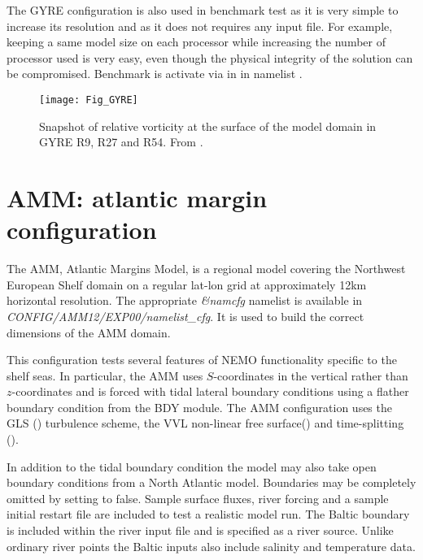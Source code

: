\documentclass[../tex_main/NEMO_manual]{subfiles}
\begin{document}
The GYRE configuration is also used in benchmark test as it is very simple to increase 
its resolution and as it does not requires any input file. For example, keeping a same model size 
on each processor while increasing the number of processor used is very easy, even though the 
physical integrity of the solution can be compromised. Benchmark is activate via  in  in namelist .

\begin{figure}[!t]   \begin{center}
\texttt{[image: Fig\_GYRE]}
\caption{  \protect\label{fig:GYRE}   
Snapshot of relative vorticity at the surface of the model domain 
in GYRE R9, R27 and R54. From \citet{Levy_al_OM10}.}
\end{center}   \end{figure}

\section{AMM: atlantic margin configuration}
\label{sec:MISC_config_AMM}

The AMM, Atlantic Margins Model, is a regional model covering the
Northwest European Shelf domain on a regular lat-lon grid at
approximately 12km horizontal resolution. The appropriate 
\textit{\&namcfg} namelist  is available in \textit{CONFIG/AMM12/EXP00/namelist\_cfg}.
It is used to build the correct dimensions of the AMM domain.

This configuration tests several features of NEMO functionality specific
to the shelf seas.
In particular, the AMM uses $S$-coordinates in the vertical rather than
$z$-coordinates and is forced with tidal lateral boundary conditions
using a flather boundary condition from the BDY module.
The AMM configuration  uses the GLS () turbulence scheme, the
VVL non-linear free surface() and time-splitting
().

In addition to the tidal boundary condition the model may also take
open boundary conditions from a North Atlantic model. Boundaries may be
completely omitted by setting  to false.
Sample surface fluxes, river forcing and a sample initial restart file
are included to test a realistic model run. The Baltic boundary is
included within the river input file and is specified as a river source.
Unlike ordinary river points the Baltic inputs also include salinity and
temperature data.
\end{document}
